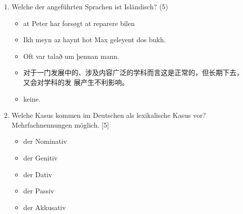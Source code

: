 \documentclass[fleqn,10pt,a4paper]{article}
\begin{document}
\begin{enumerate}
\item Welche der angeführten Sprachen ist Isländisch? (5)
\begin{itemize}
\item[$\bigcirc$] at Peter har forsøgt at reparere bilen
\item[$\bigcirc$] Ikh meyn  az   haynt hot Max geleyent dos bukh.
\item[$\bigcirc$] Oft var   talað      um   þennan mann.
\item[$\bigcirc$] 对于一门发展中的、涉及内容广泛的学科而言这是正常的，但长期下去，又会对学科的发
展产生不利影响。 
\item[$\bigcirc$] keine.
\end{itemize}


\item Welche Kasus kommen im Deutschen als lexikalische Kasus vor? Mehrfachnennungen möglich. [5]
\begin{itemize}
\item[$\bigcirc$] der Nominativ
\item[$\bigcirc$] der Genitiv
\item[$\bigcirc$] der Dativ
\item[$\bigcirc$] der Passiv
\item[$\bigcirc$] der Akkusativ
\end{itemize}




\end{enumerate}
\end{document}

